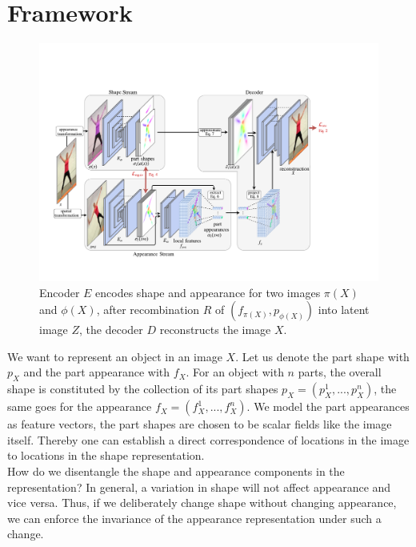 \section{Framework}\label{sec:framework}
	\begin{figure}[t]
		\centering
		\includegraphics[trim={0cm 0cm 0cm 0cm},clip, width=1.\linewidth]{fig/architecture_final}
		\caption{Encoder $E$ encodes shape and appearance for two images $\pi(X)$ and $\phi(X)$, after recombination $R$ of $(f_{\pi(X)}, p_{\phi(X)})$ into latent image $Z$, the decoder $D$ reconstructs the image $X$.}
		\label{fig:framework}
	\end{figure}
	We want to represent an object in an image $X$. Let us denote the part shape with $p_X$ and the part appearance with $f_X$. For an object with $n$ parts, the overall shape is constituted by the collection of its part shapes $p_X =  (p^1_X, ...,  p^n_X)$, the same goes for the appearance $f_X =  (f^1_X, ...,  f^n_X)$. We model the part appearances as feature vectors, the part shapes are chosen to be scalar fields like the image itself. Thereby one can establish a direct correspondence of locations in the image to locations in the shape representation.\\
	How do we disentangle the shape and appearance components in the representation? In general, a variation in shape will not affect appearance and vice versa. Thus, if we deliberately change shape without changing appearance, we can enforce the invariance of the appearance representation under such a change.
